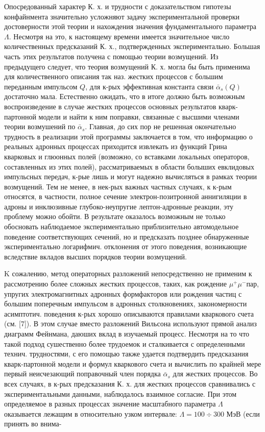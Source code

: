 \documentclass[10pt]{article}
\begin{document}
Опосредованный характер К. х. и трудности с доказательством гипотезы конфайнмента значительно усложняют задачу экспериментальной проверки достоверности этой теории и нахождения значения фундаментального параметра $\Lambda$. Несмотря на это, к настоящему времени имеется значительное число количественных предсказаний К. х., подтвержденных экспериментально. Большая часть этих результатов получена с помощью теории возмущений. Из предыдущего следует, что теория возмущений К. х. могла бы быть применима для количественного описания так наз. жестких процессов с большим переданным импульсом $Q$, для к-рых эффективная константа связи $\bar{\alpha}_{s}(Q)$ достаточно мала. Естественно ожидать, что в итоге должно быть возможным воспроизведение в случае жестких процессов основных результатов кварк-партонной модели и найти к ним поправки, связанные с высшими членами теории возмушений по $\bar{\alpha}_{s}$. Главная, до сих пор не решенная окончательно трудность в реализации этой программы заключается в том, что информацию о реальных адронных процессах приходится извлекать из функций Грина кварковых и глюонных полей (возможно, со вставками локальных операторов, составленных из этих полей), рассматриваемых в области болыших евклидовых импульсных передач, к-рые лишь и могут надежно вычисляться в рамках теории возмущений. Тем не менее, в нек-рых важных частных случаях, к к-рым относятся, в частности, полное сечение электрон-позитронной аннигиляции в адроны и инклюзивные глубоко-неупругие лептон-адронные реакции, эту проблему можно обойти. В результате оказалось возможным не только обосновать наблюдаемое экспериментально приблизительно автомодельное поведение соответствующих сечений, но и предсказать позднее обнаруженные экспериментально логарифмич. отклонения от этого поведения, возникающие вследствие вкладов высших порядков теории возмущений.



K сожалению, метод операторных разложений непосредственно не применим к рассмотрению более сложных жестких процессов, таких, как рождение $\mu^{+} \mu^{-}$пар, упругих электромагнитных адронных формфакторов или рождения частиц с большим поперечным импульсом в адронных столкновениях, закономерности асимптотич. поведения к-рых хорошо описываются правилами кваркового счета (см. [7]). В этом случае вместо разложений Вильсона используют прямой анализ диаграмм Фейнмана, даюших вклад в изучаемый процесс. Несмотря на то что такой подход сушественно более трудоемок и сталкивается с определенными технич. трудностями, с его помощью также удается подтвердить предсказания кварк-партонной модели и формул кваркового счета и вычислить по крайней мере первый неисчезающий поправочный член порядка $\bar{\alpha}_{s}$ для жестких процессов. Во всех случаях, в к-рых предсказания К. х. для жестких процессов сравнивались с экспериментальными данными, наблюдалось взаимное согласие. При этом определяемое в разных процессах значение масштабного параметра $\Lambda$ оказывается лежащим в относительно узком интервале: $\Lambda=100 \div 300$ МэВ (если принять во внима-
\end{document}
